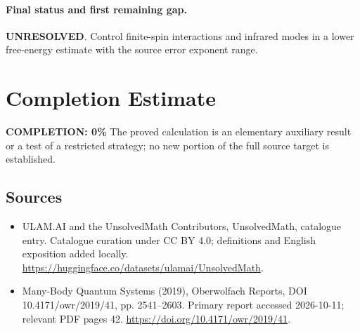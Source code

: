 \documentclass[11pt]{article}
\begin{document}
\paragraph{Final status and first remaining gap.}
\textbf{UNRESOLVED}. Control finite-spin interactions and infrared modes in a lower free-energy estimate with the source error exponent range.

\section{Completion Estimate}
\noindent\textbf{COMPLETION: 0\%}
The proved calculation is an elementary auxiliary result or a test of a restricted strategy; no new portion of the full source target is established.

\subsection{Sources}
\begin{itemize}
\item[\hypertarget{source:statement:1}{S1}] ULAM.AI and the UnsolvedMath Contributors, UnsolvedMath, catalogue entry. Catalogue curation under CC BY 4.0; definitions and English exposition added locally.
\url{https://huggingface.co/datasets/ulamai/UnsolvedMath}.
\item[\hypertarget{source:statement:2}{S2}] Many-Body Quantum Systems (2019), Oberwolfach Reports, DOI 10.4171/owr/2019/41, pp. 2541--2603. Primary report accessed 2026-10-11; relevant PDF pages 42.
\url{https://doi.org/10.4171/owr/2019/41}.
\end{itemize}
\label{end:statement}
\end{document}
